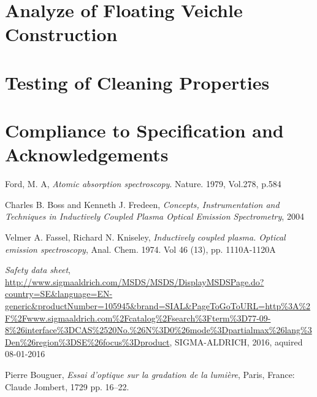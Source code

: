 \documentclass[11pt]{article}
\begin{document}
\clearpage

\clearpage

\clearpage

\part{Analyze of Floating Veichle Construction}

\clearpage

\part{Testing of Cleaning Properties}

\clearpage

\clearpage
\part{Compliance to Specification and Acknowledgements}

\clearpage

\clearpage
\begin{thebibliography}{9}
        Ford, M. A,
        \emph{Atomic absorption spectroscopy}.
        Nature. 1979, Vol.278, p.584

        Charles B. Boss and Kenneth J. Fredeen,
        \emph{Concepts, Instrumentation and Techniques in Inductively Coupled Plasma Optical Emission Spectrometry},
        2004

        Velmer A. Fassel, Richard N. Kniseley,
        \emph{Inductively coupled plasma. Optical emission spectroscopy},
        Anal. Chem. 1974. Vol 46 (13), pp. 1110A-1120A

        \emph{Safety data sheet},
\url{http://www.sigmaaldrich.com/MSDS/MSDS/DisplayMSDSPage.do?country=SE&language=EN-generic&productNumber=105945&brand=SIAL&PageToGoToURL=http%3A%2F%2Fwww.sigmaaldrich.com%2Fcatalog%2Fsearch%3Fterm%3D77-09-8%26interface%3DCAS%2520No.%26N%3D0%26mode%3Dpartialmax%26lang%3Den%26region%3DSE%26focus%3Dproduct},
    SIGMA-ALDRICH, 2016, aquired 08-01-2016

        Pierre Bouguer,
        \emph{Essai d'optique sur la gradation de la lumière},
        Paris, France: Claude Jombert, 1729 pp. 16–22.



\end{thebibliography}
\clearpage

\appendix
\begin{appendices}
  
\end{appendices}
\end{document}
